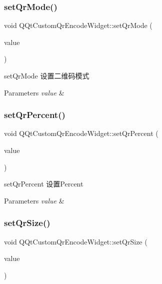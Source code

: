 \subsubsection{\texorpdfstring{set\+Qr\+Mode()}{setQrMode()}}
{\footnotesize\ttfamily void Q\+Qt\+Custom\+Qr\+Encode\+Widget\+::set\+Qr\+Mode (\begin{DoxyParamCaption}\item[{const \mbox{\hyperlink{class_q_qt_custom_qr_encode_widget_a57caf10e5dda4bb3f138018d083071e6}{Q\+R\+\_\+\+M\+O\+DE}} \&}]{value }\end{DoxyParamCaption})}



set\+Qr\+Mode 设置二维码模式 


\begin{DoxyParams}{Parameters}
{\em value} & \\
\hline
\end{DoxyParams}
\mbox{\label{class_q_qt_custom_qr_encode_widget_adeba985299fc5f71c6c41ac0fa9abeb3}} 
\subsubsection{\texorpdfstring{set\+Qr\+Percent()}{setQrPercent()}}
{\footnotesize\ttfamily void Q\+Qt\+Custom\+Qr\+Encode\+Widget\+::set\+Qr\+Percent (\begin{DoxyParamCaption}\item[{const qreal \&}]{value }\end{DoxyParamCaption})}



set\+Qr\+Percent 设置\+Percent 


\begin{DoxyParams}{Parameters}
{\em value} & \\
\hline
\end{DoxyParams}
\mbox{\label{class_q_qt_custom_qr_encode_widget_a21b4fbb761bf2493e80abdba42a1b6ea}} 
\subsubsection{\texorpdfstring{set\+Qr\+Size()}{setQrSize()}}
{\footnotesize\ttfamily void Q\+Qt\+Custom\+Qr\+Encode\+Widget\+::set\+Qr\+Size (\begin{DoxyParamCaption}\item[{const Q\+Size \&}]{value }\end{DoxyParamCaption})}




